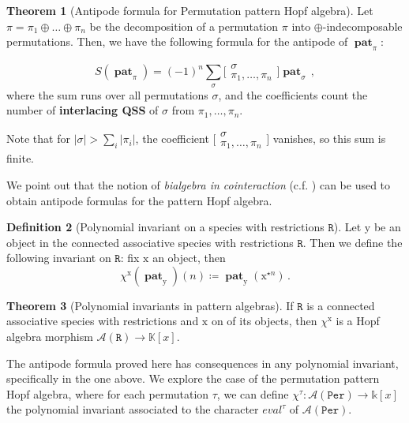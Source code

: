 \documentclass[12pt, reqno]{amsart}
\theoremstyle{definition}
\newtheorem{thm}{Theorem}[section]
\newtheorem{defin}[thm]{Definition}
\DeclareMathOperator{\pat}{\mathbf{pat}}
\begin{document}
\begin{thm}[Antipode formula for Permutation pattern Hopf algebra]\label{thm:antipode_perms_intro}
Let $\pi = \pi_1\oplus \dots \oplus \pi_n$ be the decomposition of a permutation $\pi$ into $\oplus$-indecomposable permutations.
Then, we have the following formula for the antipode of $\pat_{\pi}$:

$$S(\pat_{\pi}) = (-1)^n \sum_{\sigma} \bigl[\!\begin{smallmatrix} \sigma \\ \pi_1, \dots, \pi_n \end{smallmatrix}\!\bigr] \pat_{\sigma}\, ,$$
where the sum runs over all permutations $\sigma$, and the coefficients count the number of \textbf{interlacing QSS} of $\sigma$ from $\pi_1, \dots, \pi_n$.
\end{thm}

Note that for $|\sigma| > \sum_i |\pi_i|$, the coefficient $\bigl[\!\begin{smallmatrix} \sigma \\ \pi_1, \dots, \pi_n \end{smallmatrix}\!\bigr]$ vanishes, so this sum is finite.

We point out that the notion of \emph{bialgebra in cointeraction} (c.f. \cite{Foissy}) can be used to obtain antipode formulas for the pattern Hopf algebra.

\begin{defin}[Polynomial invariant on a species with restrictions $\mathtt{R}$]
Let $\mathrm{y}$ be an object in the connected associative species with restrictions $\mathtt{R}$.
Then we define the following invariant on $\mathtt{R}$: fix $\mathrm{x}$ an object, then
$$\chi^{\mathrm{x}}(\pat_{\mathrm{y}})(n) \coloneqq \pat_{\mathrm{y}}(\mathrm{x}^{\star n})\, . $$
\end{defin}


\begin{thm}[Polynomial invariants in pattern algebras]\label{thm:polynomiality}
If $\mathtt{R}$ is a connected associative species with restrictions and $\mathrm{x}$ on of its objects, then $\chi^{\mathrm{x}}$ is a Hopf algebra morphism $\mathcal A(\mathtt{R}) \to \mathbb{K}[x]$.
\end{thm}
The antipode formula proved here has consequences in any polynomial invariant, specifically in the one above.
We explore the case of the permutation pattern Hopf algebra, where for each permutation $\tau$, we can define $\chi^{\tau}: \mathcal{A}(\mathtt{Per}) \to \mathbb{k}[x]$ the polynomial invariant associated to the character $eval^{\tau}$ of $\mathcal{A}(\mathtt{Per})$.
\end{document}
